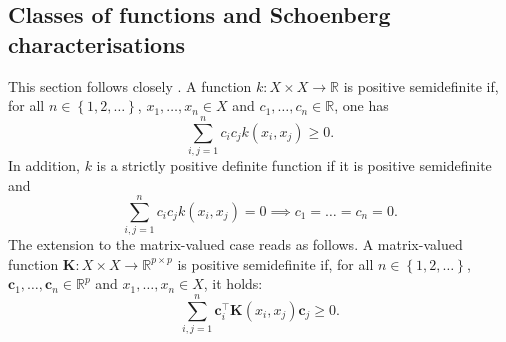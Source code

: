 \documentclass[12pt]{article}
\theoremstyle{plain}
\theoremstyle{remark}
\newcommand{\curly}[1]{\left\{ #1 \right\}}
\newcommand{\R}[0]{\mathbb{R}}
\newcommand{\dVec}[1]{{\bm{#1}}}            %
\newcommand{\latMatr}[1]{\mathbf{#1}}          %
\newcommand{\tobi}[1]{\textcolor{teal}{#1}}
\begin{document}
\subsection{Classes of functions and Schoenberg characterisations}
    \label{ssec:positiveDefiniteFunctions}
    This section follows closely \cite{zastavnyi_analog_2023}. A %
    function $k:X\times X \to \R$ is positive semidefinite if, for all $n\in\curly{1,2,\dots}$, ${x}_1,\dots,{x}_n \in X$ and $c_1,\dots,c_n \in \R$, one has 
    \begin{equation}
        \label{eq:positSemiDefFunction}
        \sum_{i,j=1}^n c_i c_j k({x}_i, {x}_j) \geq 0.
    \end{equation}
    In addition, $k$ is a strictly positive definite function if it is positive semidefinite and
    \begin{equation}
        \sum_{i,j=1}^n c_i c_j k(x_i,x_j) = 0 \implies c_1=\dots=c_n = 0.
    \end{equation} 
    The extension to the matrix-valued case reads as follows. A matrix-valued function $\latMatr K :X\times X \to \R^{p\times p}$ is positive semidefinite if, for all $n\in\curly{1,2,\dots}$, ${\dVec{c}}_1,\dots,{\dVec{c}}_n\in\R^p$ and ${x}_1,\dots,{x}_n\in X$, it holds:
    \begin{equation}
        \label{eq:positiveSemidef}
        \sum_{i,j=1}^n {\dVec{c}}_i^\top \latMatr{K}(x_i,x_j) {\dVec{c}}_j \geq 0.
    \end{equation}
\end{document}
